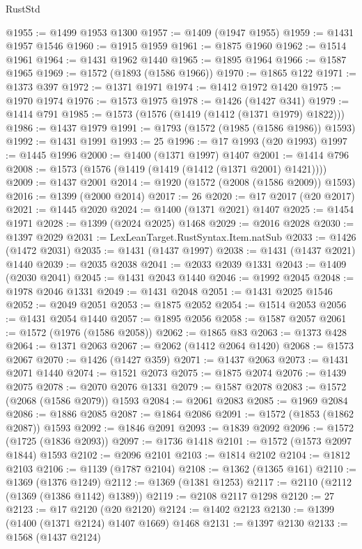 \begin{lexlean}{RustStd}
\begin{coremodule}
@1955 := @1499 @1953 @1300
@1957 := @1409 (@1947 @1955)
@1959 := @1431 @1957 @1546
@1960 := @1915 @1959
@1961 := @1875 @1960
@1962 := @1514 @1961
@1964 := @1431 @1962 @1440
@1965 := @1895 @1964
@1966 := @1587 @1965
@1969 := @1572 (@1893 (@1586 @1966))
@1970 := @1865 @122
@1971 := @1373 @397
@1972 := @1371 @1971
@1974 := @1412 @1972 @1420
@1975 := @1970 @1974
@1976 := @1573 @1975
@1978 := @1426 (@1427 @341)
@1979 := @1414 @791
@1985 := @1573 (@1576 (@1419 (@1412 (@1371 @1979) @1822)))
@1986 := @1437 @1979
@1991 := @1793 (@1572 (@1985 (@1586 @1986)) @1593)
@1992 := @1431 @1991
@1993 := 25
@1996 := @17 @1993 (@20 @1993)
@1997 := @1445 @1996
@2000 := @1400 (@1371 @1997) @1407
@2001 := @1414 @796
@2008 := @1573 (@1576 (@1419 (@1419 (@1412 (@1371 @2001) @1421))))
@2009 := @1437 @2001
@2014 := @1920 (@1572 (@2008 (@1586 @2009)) @1593)
@2016 := @1399 (@2000 @2014)
@2017 := 26
@2020 := @17 @2017 (@20 @2017)
@2021 := @1445 @2020
@2024 := @1400 (@1371 @2021) @1407
@2025 := @1454 @1971
@2028 := @1399 (@2024 @2025) @1468
@2029 := @2016 @2028
@2030 := @1397 @2029
@2031 := LexLeanTarget.RustSyntax.Item.natSub
@2033 := @1426 (@1472 @2031)
@2035 := @1431 (@1437 @1997)
@2038 := @1431 (@1437 @2021) @1440
@2039 := @2035 @2038
@2041 := @2033 @2039 @1331
@2043 := @1409 (@2030 @2041)
@2045 := @1431 @2043 @1440
@2046 := @1992 @2045
@2048 := @1978 @2046 @1331
@2049 := @1431 @2048
@2051 := @1431 @2025 @1546
@2052 := @2049 @2051
@2053 := @1875 @2052
@2054 := @1514 @2053
@2056 := @1431 @2054 @1440
@2057 := @1895 @2056
@2058 := @1587 @2057
@2061 := @1572 (@1976 (@1586 @2058))
@2062 := @1865 @83
@2063 := @1373 @428
@2064 := @1371 @2063
@2067 := @2062 (@1412 @2064 @1420)
@2068 := @1573 @2067
@2070 := @1426 (@1427 @359)
@2071 := @1437 @2063
@2073 := @1431 @2071 @1440
@2074 := @1521 @2073
@2075 := @1875 @2074
@2076 := @1439 @2075
@2078 := @2070 @2076 @1331
@2079 := @1587 @2078
@2083 := @1572 (@2068 (@1586 @2079)) @1593
@2084 := @2061 @2083
@2085 := @1969 @2084
@2086 := @1886 @2085
@2087 := @1864 @2086
@2091 := @1572 (@1853 (@1862 @2087)) @1593
@2092 := @1846 @2091
@2093 := @1839 @2092
@2096 := @1572 (@1725 (@1836 @2093))
@2097 := @1736 @1418
@2101 := @1572 (@1573 @2097 @1844) @1593
@2102 := @2096 @2101
@2103 := @1814 @2102
@2104 := @1812 @2103
@2106 := @1139 (@1787 @2104)
@2108 := @1362 (@1365 @161)
@2110 := @1369 (@1376 @1249)
@2112 := @1369 (@1381 @1253)
@2117 := @2110 (@2112 (@1369 (@1386 @1142) @1389))
@2119 := @2108 @2117 @1298
@2120 := 27
@2123 := @17 @2120 (@20 @2120)
@2124 := @1402 @2123
@2130 := @1399 (@1400 (@1371 @2124) @1407 @1669) @1468
@2131 := @1397 @2130
@2133 := @1568 (@1437 @2124)

\end{coremodule}
\end{lexlean}
